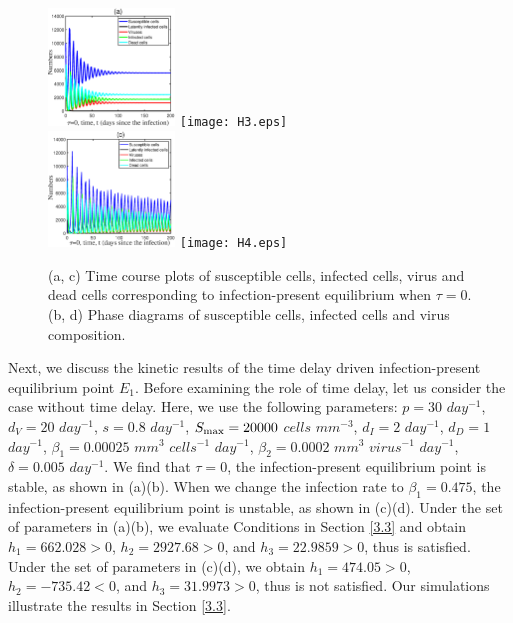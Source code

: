 \documentclass{CMHPhD-SIVD}
\begin{document}
\begin{figure}[h!]
\centering
\includegraphics[height=0.16\textheight,width=0.3\textwidth]{H1.eps}
\texttt{[image: H3.eps]}\\
\includegraphics[height=0.16\textheight,width=0.3\textwidth]{H2.eps}
\texttt{[image: H4.eps]}
\vspace{3mm}
\caption{(a, c) Time course plots of susceptible cells, infected cells, virus and dead cells corresponding to infection-present equilibrium when $\tau=0$. (b, d) Phase diagrams of susceptible cells, infected cells and virus composition.}
\label{Fig.2}
\end{figure}

Next, we discuss the kinetic results of the time delay driven infection-present equilibrium point $E_1$. 
Before examining the role of time delay, let us consider the case without time delay. Here, we use the following parameters: $p=30$ $day^{-1}$, $d_V=20$ $day^{-1}$, $s=0.8$ $day^{-1}$, $S_{\text{max}}=20000$ $cells$ $mm^{-3}$, $d_I=2$ $day^{-1}$, $d_D=1$ $day^{-1}$, $\beta_1=0.00025$ $mm^{3}$ $cells^{-1}$ $day^{-1}$, $\beta_2=0.0002$ $mm^{3}$ $virus^{-1}$ $day^{-1}$, $\delta=0.005$ $day^{-1}$. We find that $\tau=0$, the infection-present equilibrium point is stable, as shown in (a)(b). When we change the infection rate to $\beta_1=0.475$, the infection-present equilibrium point is unstable, as shown in (c)(d). Under the set of parameters in (a)(b), we evaluate Conditions  in Section \ref{3.3} and obtain $h_1=662.028>0$, $h_2=2927.68>0$, and $h_3=22.9859>0$, thus  is satisfied. Under the set of parameters in (c)(d),  we obtain $h_1=474.05>0$, $h_2=-735.42<0$, and $h_3=31.9973>0$, thus  is not satisfied. Our simulations illustrate the results in Section \ref{3.3}.
\end{document}
